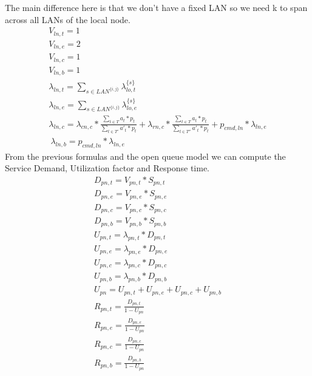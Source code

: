 \documentclass[11pt]{article}
\begin{document}
The main difference here is that we don't have a fixed LAN so we need k to span across all LANs of the local node.
\begin{equation}
    \begin{array}{l}
        V_{ln, t} = 1 \\
        V_{ln, e} = 2 \\ %
        V_{ln, c} = 1 \\
        V_{ln, b} = 1 \\
        \lambda_{ln, t} = \sum\limits_{s \in LAN^{\{i,j\}}}{\lambda^{\{s\}}_{lo, t}}  \\
        \lambda_{ln, e} = \sum\limits_{s \in LAN^{\{i,j\}}}{\lambda^{\{s\}}_{lo, e}} \\
		\lambda_{ln, c} = \lambda_{cn, c} * \frac{\sum\limits_{t \in T}{a_{t} * p_{t}}}{\sum\limits_{t \in T'}{a'_{t} * p_{t}}} + \lambda_{rn, c} *\frac{\sum\limits_{t \in T}{a_{t} * p_{t}}}{\sum\limits_{t \in T''}{a'_{t} * p_{t}}}  + p_{cmd,ln} * \lambda_{ln, e} \\\

        \lambda_{ln, b} = p_{cmd, ln} * \lambda_{ln,e}

    \end{array}
\end{equation}
From the previous formulas and the open queue model we can compute the Service Demand, Utilization factor and Response time.
\begin{equation}
    \begin{array}{l}
        D_{pn, t} = V_{pn, t} * S_{pn, t} \\
        D_{pn, e} = V_{pn, e} * S_{pn, e} \\
        D_{pn, c} = V_{pn, c} * S_{pn, c} \\
        D_{pn, b} = V_{pn, b} * S_{pn, b} \\
        U_{pn, t} = \lambda_{pn, t} * D_{pn, t} \\
        U_{pn, e} = \lambda_{pn, e} * D_{pn, e} \\
        U_{pn, c} = \lambda_{pn, c} * D_{pn, c} \\
        U_{pn, b} = \lambda_{pn, b} * D_{pn, b} \\
        U_{pn} = U_{pn, t} + U_{pn, e} + U_{pn, c} + U_{pn, b} \\
        R_{pn, t} = \frac{D_{pn, t}}{1 - U_{pn}} \\
        R_{pn, e} = \frac{D_{pn, e}}{1 - U_{pn}} \\
        R_{pn, c} = \frac{D_{pn, c}}{1 - U_{pn}} \\
        R_{pn, b} = \frac{D_{pn, b}}{1 - U_{pn}} \\
    \end{array}
\end{equation}
\end{document}
